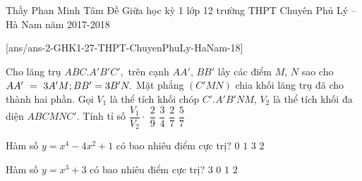 \begin{name}
{Thầy Phan Minh Tâm}
{Đề Giữa học kỳ 1 lớp  12 trường THPT Chuyên Phủ Lý – Hà Nam năm 2017-2018}
\end{name}
\setcounter{ex}{0}
[ans/ans-2-GHK1-27-THPT-ChuyenPhuLy-HaNam-18]

\begin{ex}%
Cho lăng trụ $ ABC.A'B'C',$ trên cạnh $ AA', \, BB' $ lấy các điểm $ M, \, N $ sao cho $ AA'~=~3A'M;\\ BB' = 3B'N. $ Mặt phẳng $ \left(C'MN\right) $ chia khối lăng trụ đã cho thành hai phần. Gọi $ V_1 $ là thể tích khối chóp $ C'.A'B'NM $, $ V_2 $ là thể tích khối đa diện $ ABCMNC'. $ Tính tỉ số $ \dfrac{V_1}{V_2 }\cdot $
\choice
{ $ \dfrac{2}{9} $}
{$ \dfrac{3}{4} $}
{\True $ \dfrac{2}{7} $}
{ $ \dfrac{5}{7} $}
\end{ex}

\begin{ex}%
Hàm số $ y = x^4 - 4x^2 + 1 $	có bao nhiêu điểm cực trị?
	\choice
	{$ 0 $}
	{$ 1 $}
	{\True $ 3 $}
	{$ 2 $ }
\end{ex}

\begin{ex}%
	Hàm số $ y = x^3 + 3 $ có bao nhiêu điểm cực trị?
	\choice
	{$ 3 $}
	{\True $ 0 $}
	{$ 1 $}
	{$ 2 $ }
\end{ex}

